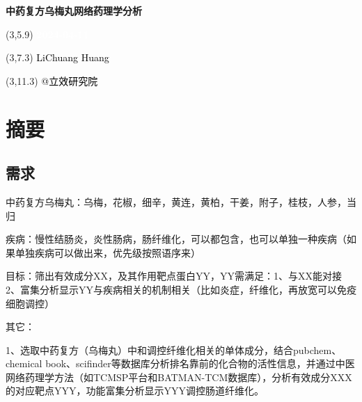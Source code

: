 \documentclass[
]{article}
\author{}
\date{\vspace{-2.5em}}
\begin{document}
\begin{titlepage} 
\begin{center} \textbf{\Huge
中药复方乌梅丸网络药理学分析} \vspace{4em}
\begin{textblock}{10}(3,5.9) \huge
\textbf{\textcolor{white}{2024-04-11}}
\end{textblock} \begin{textblock}{10}(3,7.3)
\Large \textcolor{black}{LiChuang Huang}
\end{textblock} \begin{textblock}{10}(3,11.3)
\Large \textcolor{black}{@立效研究院}
\end{textblock} \end{center} \end{titlepage}
\restoregeometry


\tableofcontents

\listoffigures

\listoftables

\newpage


\hypertarget{abstract}{%
\section{摘要}\label{abstract}}

\hypertarget{ux9700ux6c42}{%
\subsection{需求}\label{ux9700ux6c42}}

中药复方乌梅丸：乌梅，花椒，细辛，黄连，黄柏，干姜，附子，桂枝，人参，当归

疾病：慢性结肠炎，炎性肠病，肠纤维化，可以都包含，也可以单独一种疾病（如果单独疾病可以做出来，优先级按照语序来）

目标：筛出有效成分XX，及其作用靶点蛋白YY，YY需满足：1、与XX能对接 2、富集分析显示YY与疾病相关的机制相关（比如炎症，纤维化，再放宽可以免疫细胞调控）

其它：

1、选取中药复方（乌梅丸）中和调控纤维化相关的单体成分，结合pubchem、chemical book、scifinder等数据库分析排名靠前的化合物的活性信息，并通过中医网络药理学方法（如TCMSP平台和BATMAN-TCM数据库），分析有效成分XXX的对应靶点YYY，功能富集分析显示YYY调控肠道纤维化。
\end{document}
